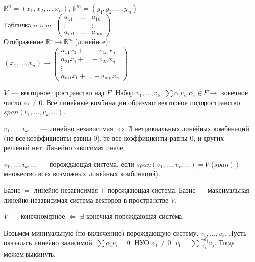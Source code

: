 \documentclass[12pt]{article}
\begin{document}
	$\mathbb{R}^n = (x_1, x_2, \dots, x_n)$, $\mathbb{R}^m = (y_1, y_2, \dots, y_m)$ \\
	Табличка $n \times m$: $\left(
	\begin{smallmatrix}
		a_{11} & \dots & a_{1n} \\
		\vdots &  & \vdots \\
		a_{m1} & \dots & a_{mn}
	\end{smallmatrix}
	\right)$ \\
	Отображение $\mathbb{R}^n \rightarrow \mathbb{R}^m$ (линейное): \\
	$(x_1, \dots, x_n) \rightarrow \left(
	\begin{smallmatrix}
		a_{11}x_1 + \dots + a_{1n}x_n \\
		a_{21}x_1 + \dots + a_{2n}x_n \\
		\vdots \\
		a_{m1}x_1 + \dots + a_{mn}x_n
	\end{smallmatrix}
	\right)$
	\begin{definition}
		$V$~--- векторное пространство над $F$. Набор $v_1, \dots, v_k$. $\sum \alpha_i v_i, \alpha_i \in F \rightarrow$ конечное число $\alpha_i \not= 0$. Все линейные комбинации образуют векторное подпространство $span(v_1, \dots, v_k, \dots)$.
	\end{definition}
	\begin{definition}
		$v_1, \dots, v_k, \dots$~--- линейно независимая $\Leftrightarrow$ $\nexists$ нетривиальных линейных комбинаций (не все коэффициенты равны $0$), те все коэффициенты равны $0$, и других решений нет. Линейно зависимая иначе.
	\end{definition}
	\begin{definition}
		$v_1, \dots, v_k, \dots$~--- порождающая система, если $span(v_1, \dots, v_k, \dots) = V$ ($span()$~--- множество всех возможных линейных комбинаций).
	\end{definition}
	\begin{definition}
		Базис $=$ линейно независимая $+$ порождающая система. Базис~--- максимальная линейно независимая система векторов в пространстве $V$.
	\end{definition}
	\begin{definition}
		$V$~--- конечномерное $\Leftrightarrow$ $\exists$ конечная порождающая система.
	\end{definition}
	\noindent
	Возьмем минимальную (по включению) порождающую систему. $v_1, \dots, v_e$. Пусть оказалась линейно зависимой. $\sum \alpha_i v_i = 0$. НУО $\alpha_1 \not= 0$. $v_1 = \sum \frac{-d_j}{d_1} v_j$. Тогда можем выкинуть. \\
\end{document}
